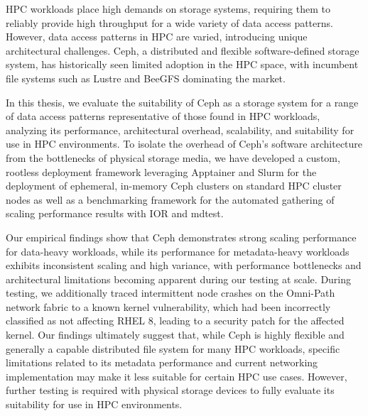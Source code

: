 \ac{HPC} workloads place high demands on storage systems, requiring them to reliably provide high throughput for a wide variety of data access patterns. However, data access patterns in \ac{HPC} are varied, introducing unique architectural challenges. Ceph, a distributed and flexible software-defined storage system, has historically seen limited adoption in the \ac{HPC} space, with incumbent file systems such as Lustre and BeeGFS dominating the market. 

In this thesis, we evaluate the suitability of Ceph as a storage system for a range of data access patterns representative of those found in \ac{HPC} workloads, analyzing its performance, architectural overhead, scalability, and suitability for use in \ac{HPC} environments. To isolate the overhead of Ceph's software architecture from the bottlenecks of physical storage media, we have developed a custom, rootless deployment framework leveraging Apptainer and Slurm for the deployment of ephemeral, in-memory Ceph clusters on standard \ac{HPC} cluster nodes as well as a benchmarking framework for the automated gathering of scaling performance results with \acs{IOR} and mdtest.

Our empirical findings show that Ceph demonstrates strong scaling performance for data-heavy workloads, while its performance for metadata-heavy workloads exhibits inconsistent scaling and high variance, with performance bottlenecks and architectural limitations becoming apparent during our testing at scale. During testing, we additionally traced intermittent node crashes on the Omni-Path network fabric to a known kernel vulnerability, which had been incorrectly classified as not affecting \ac{RHEL} 8, leading to a security patch for the affected kernel. Our findings ultimately suggest that, while Ceph is highly flexible and generally a capable distributed file system for many \ac{HPC} workloads, specific limitations related to its metadata performance and current networking implementation may make it less suitable for certain \ac{HPC} use cases. However, further testing is required with physical storage devices to fully evaluate its suitability for use in \ac{HPC} environments.